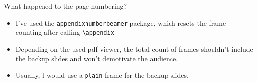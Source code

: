 \documentclass[aspectratio=169]{beamer}
\begin{document}
\begin{frame}{What happened to the page numbering?}
  \begin{itemize}
    \item I've used the \texttt{appendixnumberbeamer}
          package, which resets the frame counting after calling
          \texttt{\textbackslash{}appendix}
    \item Depending on the used pdf viewer, the total
          count of frames shouldn't include the backup slides and
          won't demotivate the audience.
    \item Usually, I would use a \texttt{plain} frame
          for the backup slides.
  \end{itemize}
\end{frame}
\end{document}
